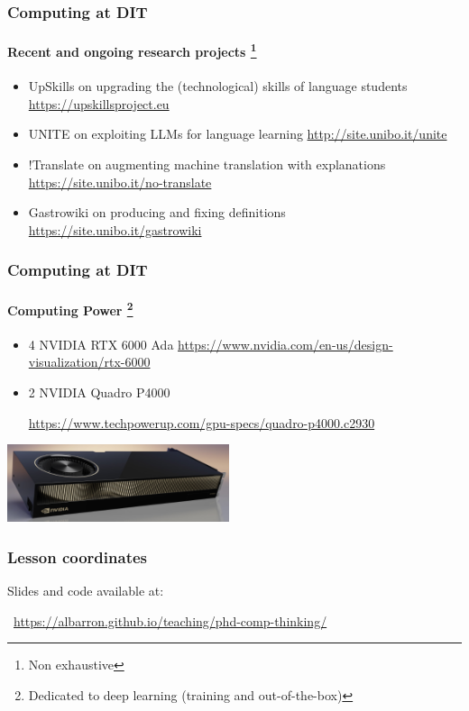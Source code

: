 \documentclass[xcolor=x11names,handout]{beamer}
\newcommand{\light}[1]{\textcolor{gray}{#1}}
\begin{document}
\begin{frame}
\frametitle{Computing at DIT}
\framesubtitle{Recent and ongoing research projects%
\footnote{Non exhaustive}} 

\begin{itemize}
 \item \alert{UpSkills} on upgrading the (technological) skills of language 
students
	\light{\url{https://upskillsproject.eu}}
\bigskip	\pause 

 \item \alert{UNITE} on exploiting LLMs for language learning
 	\light{\url{http://site.unibo.it/unite}}
\bigskip	\pause

 \item \alert{!Translate} on augmenting machine translation with explanations
 \light{\url{https://site.unibo.it/no-translate}}
\bigskip	\pause 
 
 \item \alert{Gastrowiki} on producing and fixing definitions
	\light{\url{https://site.unibo.it/gastrowiki}}
\end{itemize}
\end{frame}

\begin{frame}
\frametitle{Computing at DIT}
\framesubtitle{Computing Power%
\footnote{Dedicated to deep learning (training and out-of-the-box)}} 

\begin{itemize}
 \item 4 NVIDIA RTX 6000 Ada
\light{\footnotesize 
\url{https://www.nvidia.com/en-us/design-visualization/rtx-6000}}
\bigskip

\item 2  NVIDIA Quadro P4000

\light{\footnotesize
\url{https://www.techpowerup.com/gpu-specs/quadro-p4000.c2930}}
\end{itemize}
\vspace{5mm}

\centering
\includegraphics[width=65mm]{img/01_dit_compthink_nvidia.png}

\end{frame}

\begin{frame}
\frametitle{Lesson coordinates}
Slides and code available at:
\bigskip

\faFirefox\, \url{https://albarron.github.io/teaching/phd-comp-thinking/}

\end{frame}
\end{document}
